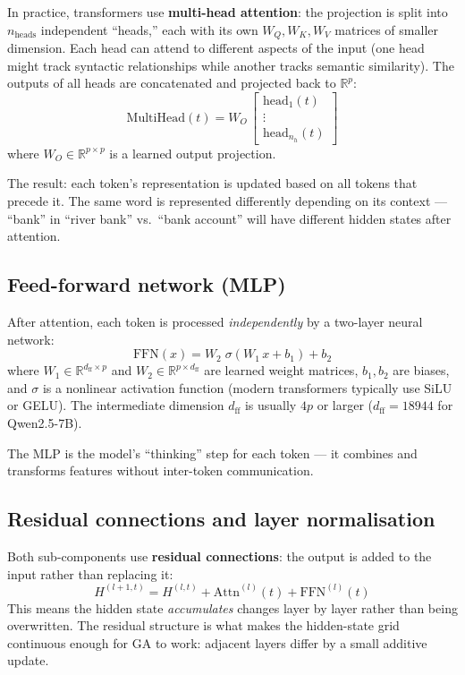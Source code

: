 \documentclass[11pt, twoside, openright]{memoir}
\begin{document}
In practice, transformers use \textbf{multi-head attention}: the
projection is split into $n_{\text{heads}}$ independent ``heads,'' each
with its own $W_Q, W_K, W_V$ matrices of smaller dimension.  Each head
can attend to different aspects of the input (one head might track
syntactic relationships while another tracks semantic similarity).
The outputs of all heads are concatenated and projected back to
$\mathbb{R}^p$:
\[
  \mathrm{MultiHead}(t) = W_O \,
    \begin{bmatrix} \mathrm{head}_1(t) \\ \vdots \\ \mathrm{head}_{n_h}(t) \end{bmatrix}
\]
where $W_O \in \mathbb{R}^{p \times p}$ is a learned output projection.

The result: each token's representation is updated based on all tokens
that precede it.  The same word is represented differently depending on
its context --- ``bank'' in ``river bank'' vs.\ ``bank account'' will
have different hidden states after attention.

\subsection*{Feed-forward network (MLP)}

After attention, each token is processed \emph{independently} by a
two-layer neural network:
\[
  \mathrm{FFN}(x) = W_2 \;\sigma(W_1 \, x + b_1) + b_2
\]
where $W_1 \in \mathbb{R}^{d_{\mathrm{ff}} \times p}$ and
$W_2 \in \mathbb{R}^{p \times d_{\mathrm{ff}}}$ are learned weight
matrices, $b_1, b_2$ are biases, and $\sigma$ is a nonlinear
activation function (modern transformers typically use
SiLU or GELU).  The intermediate dimension
$d_{\mathrm{ff}}$ is usually $4p$ or larger ($d_{\mathrm{ff}} = 18944$
for Qwen2.5-7B).

The MLP is the model's ``thinking'' step for each token --- it combines
and transforms features without inter-token communication.

\subsection*{Residual connections and layer normalisation}

Both sub-components use \textbf{residual connections}: the output is
added to the input rather than replacing it:
\[
  H^{(l+1,t)} = H^{(l,t)} + \mathrm{Attn}^{(l)}(t) + \mathrm{FFN}^{(l)}(t)
\]
This means the hidden state \emph{accumulates} changes layer by layer
rather than being overwritten.  The residual structure is what makes the
hidden-state grid continuous enough for GA to work: adjacent layers
differ by a small additive update.
\end{document}

